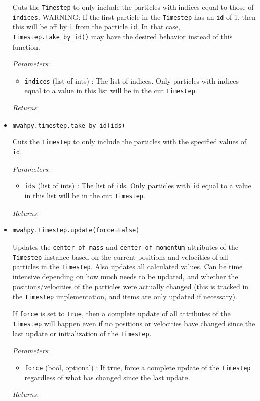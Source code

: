 \documentclass{article}
\begin{document}
\begin{itemize}
Cuts the \verb!Timestep! to only include the particles with indices equal to those of \verb!indices!. WARNING: If the first particle in the \verb!Timestep! has an \verb!id! of 1, then this will be off by 1 from the particle \verb!id!. In that case, \verb!Timestep.take_by_id()! may have the desired behavior instead of this function. 

\textit{Parameters}: \begin{itemize}

\item \verb!indices! (list of ints) : The list of indices. Only particles with indices equal to a value in this list will be in the cut \verb!Timestep!.

\end{itemize}

\textit{Returns}: 



\item \verb!mwahpy.timestep.take_by_id(ids)!

Cuts the \verb!Timestep! to only include the particles with the specified values of \verb!id!.

\textit{Parameters}: \begin{itemize}

\item \verb!ids! (list of ints) : The list of \verb!id!s. Only particles with \verb!id! equal to a value in this list will be in the cut \verb!Timestep!.

\end{itemize}

\textit{Returns}: 



\item \verb!mwahpy.timestep.update(force=False)!

Updates the \verb!center_of_mass! and \verb!center_of_momentum! attributes of the \verb!Timestep! instance based on the current positions and velocities of all particles in the \verb!Timestep!. Also updates all calculated values. Can be time intensive depending on how much needs to be updated, and whether the positions/velocities of the particles were actually changed (this is tracked in the \verb!Timestep! implementation, and items are only updated if necessary).

If \verb!force! is set to \verb!True!, then a complete update of all attributes of the \verb!Timestep! will happen even if no positions or velocities have changed since the last update or initialization of the \verb!Timestep!.

\textit{Parameters}: \begin{itemize}

\item \verb!force! (bool, optional) : If true, force a complete update of the \verb!Timestep! regardless of what has changed since the last update.

\end{itemize}

\textit{Returns}:



\end{itemize}
\end{document}
